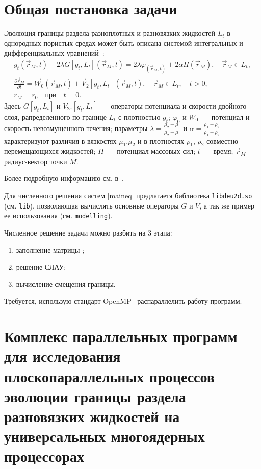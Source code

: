 \documentclass[a4paper]{report}
\numberwithin{algorithm}{section}
\begin{document}
\section{Общая постановка задачи}

Эволюция границы раздела разноплотных и разновязких жидкостей $L_t$ в однородных пористых средах 
может быть описана системой интегральных и дифференциальных уравнений~\cite{ndn2011,ndn2013}:
\begin{equation}
\label{maineq}
\begin{gathered}
g_t(\vec{r}_M,t)-2\lambda G[g_t,L_t] (\vec{r}_M,t)=2\lambda\varphi_(\vec{r}_M,t)+2\alpha\Pi(\vec{r}_M), 
\quad \vec{r}_M \in L_t,\\
\frac{\partial \vec{r}_M}{\partial t} = \vec{W}_0(\vec{r}_M,t) + \vec{V}_{2}[g_t,L_t] (\vec{r}_M,t), 
\quad \vec{r}_M \in L_t, \quad t>0,\\
r_{M} = r_0 \quad \text{при} \quad t=0.
\end{gathered}
\end{equation}
Здесь 
$G[g_t,L_t]$ и $V_{2\varepsilon}[g_t,L_t]$~--- операторы потенциала и скорости двойного слоя,
рапределенного по границе $L_t$ с плотностью $g_t$; 
$\varphi_0$ и $W_0$~--- потенциал и скорость невозмущенного течения;
параметры $\lambda=\frac{\mu_2-\mu_1}{\mu_2+\mu_1}$ и $\alpha=\frac{\rho_1-\rho_2}{\rho_1+\rho_2}$ 
характеризуют различия в вязкостях $\mu_1$,$\mu_2$ и в плотностях $\rho_1$, $\rho_2$ 
совместно перемещающихся жидкостей;
$\Pi$~--- потенциал массовых сил; $t$~--- время; $\vec{r}_M$~--- радиус-вектор точки $M$.

Более подробную информацию см. в~\cite{ndn2011,ndn2013}.

Для численного решения систем \eqref{maineq} предлагаетя библиотека \verb|libdeu2d.so| (см. \verb|lib|), 
позволяющая  вычислять основные операторы $G$ и $V$, а так же пример ее использования (см. \verb|modelling|).

Численное решение задачи можно разбить на 3 этапа:
\begin{enumerate}
\item заполнение матрицы ;
\item решение СЛАУ;
\item вычисление смещения границы.
\end{enumerate} 

Требуется, использую стандарт OpenMP~\cite{omp} распараллелить работу программ.

\section{Комплекс параллельных программ для исследования плоскопараллельных процессов эволюции границы раздела разновязких жидкостей на универсальных многоядерных процессорах}
\end{document}

